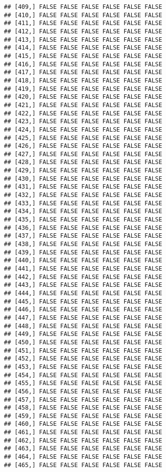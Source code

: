 \documentclass[
]{article}
\begin{document}
\begin{verbatim}
## [409,] FALSE FALSE FALSE FALSE FALSE FALSE
## [410,] FALSE FALSE FALSE FALSE FALSE FALSE
## [411,] FALSE FALSE FALSE FALSE FALSE FALSE
## [412,] FALSE FALSE FALSE FALSE FALSE FALSE
## [413,] FALSE FALSE FALSE FALSE FALSE FALSE
## [414,] FALSE FALSE FALSE FALSE FALSE FALSE
## [415,] FALSE FALSE FALSE FALSE FALSE FALSE
## [416,] FALSE FALSE FALSE FALSE FALSE FALSE
## [417,] FALSE FALSE FALSE FALSE FALSE FALSE
## [418,] FALSE FALSE FALSE FALSE FALSE FALSE
## [419,] FALSE FALSE FALSE FALSE FALSE FALSE
## [420,] FALSE FALSE FALSE FALSE FALSE FALSE
## [421,] FALSE FALSE FALSE FALSE FALSE FALSE
## [422,] FALSE FALSE FALSE FALSE FALSE FALSE
## [423,] FALSE FALSE FALSE FALSE FALSE FALSE
## [424,] FALSE FALSE FALSE FALSE FALSE FALSE
## [425,] FALSE FALSE FALSE FALSE FALSE FALSE
## [426,] FALSE FALSE FALSE FALSE FALSE FALSE
## [427,] FALSE FALSE FALSE FALSE FALSE FALSE
## [428,] FALSE FALSE FALSE FALSE FALSE FALSE
## [429,] FALSE FALSE FALSE FALSE FALSE FALSE
## [430,] FALSE FALSE FALSE FALSE FALSE FALSE
## [431,] FALSE FALSE FALSE FALSE FALSE FALSE
## [432,] FALSE FALSE FALSE FALSE FALSE FALSE
## [433,] FALSE FALSE FALSE FALSE FALSE FALSE
## [434,] FALSE FALSE FALSE FALSE FALSE FALSE
## [435,] FALSE FALSE FALSE FALSE FALSE FALSE
## [436,] FALSE FALSE FALSE FALSE FALSE FALSE
## [437,] FALSE FALSE FALSE FALSE FALSE FALSE
## [438,] FALSE FALSE FALSE FALSE FALSE FALSE
## [439,] FALSE FALSE FALSE FALSE FALSE FALSE
## [440,] FALSE FALSE FALSE FALSE FALSE FALSE
## [441,] FALSE FALSE FALSE FALSE FALSE FALSE
## [442,] FALSE FALSE FALSE FALSE FALSE FALSE
## [443,] FALSE FALSE FALSE FALSE FALSE FALSE
## [444,] FALSE FALSE FALSE FALSE FALSE FALSE
## [445,] FALSE FALSE FALSE FALSE FALSE FALSE
## [446,] FALSE FALSE FALSE FALSE FALSE FALSE
## [447,] FALSE FALSE FALSE FALSE FALSE FALSE
## [448,] FALSE FALSE FALSE FALSE FALSE FALSE
## [449,] FALSE FALSE FALSE FALSE FALSE FALSE
## [450,] FALSE FALSE FALSE FALSE FALSE FALSE
## [451,] FALSE FALSE FALSE FALSE FALSE FALSE
## [452,] FALSE FALSE FALSE FALSE FALSE FALSE
## [453,] FALSE FALSE FALSE FALSE FALSE FALSE
## [454,] FALSE FALSE FALSE FALSE FALSE FALSE
## [455,] FALSE FALSE FALSE FALSE FALSE FALSE
## [456,] FALSE FALSE FALSE FALSE FALSE FALSE
## [457,] FALSE FALSE FALSE FALSE FALSE FALSE
## [458,] FALSE FALSE FALSE FALSE FALSE FALSE
## [459,] FALSE FALSE FALSE FALSE FALSE FALSE
## [460,] FALSE FALSE FALSE FALSE FALSE FALSE
## [461,] FALSE FALSE FALSE FALSE FALSE FALSE
## [462,] FALSE FALSE FALSE FALSE FALSE FALSE
## [463,] FALSE FALSE FALSE FALSE FALSE FALSE
## [464,] FALSE FALSE FALSE FALSE FALSE FALSE
## [465,] FALSE FALSE FALSE FALSE FALSE FALSE

\end{verbatim}
\end{document}
